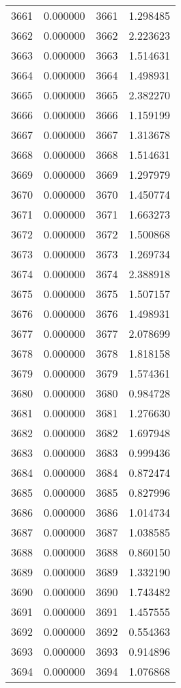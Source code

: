 \documentclass[12pt]{article}
\begin{document}
\begin{longtable}{@{}cccc@{}}
3661 & 0.000000 & 3661 & 1.298485 \\
3662 & 0.000000 & 3662 & 2.223623 \\
3663 & 0.000000 & 3663 & 1.514631 \\
3664 & 0.000000 & 3664 & 1.498931 \\
3665 & 0.000000 & 3665 & 2.382270 \\
3666 & 0.000000 & 3666 & 1.159199 \\
3667 & 0.000000 & 3667 & 1.313678 \\
3668 & 0.000000 & 3668 & 1.514631 \\
3669 & 0.000000 & 3669 & 1.297979 \\
3670 & 0.000000 & 3670 & 1.450774 \\
3671 & 0.000000 & 3671 & 1.663273 \\
3672 & 0.000000 & 3672 & 1.500868 \\
3673 & 0.000000 & 3673 & 1.269734 \\
3674 & 0.000000 & 3674 & 2.388918 \\
3675 & 0.000000 & 3675 & 1.507157 \\
3676 & 0.000000 & 3676 & 1.498931 \\
3677 & 0.000000 & 3677 & 2.078699 \\
3678 & 0.000000 & 3678 & 1.818158 \\
3679 & 0.000000 & 3679 & 1.574361 \\
3680 & 0.000000 & 3680 & 0.984728 \\
3681 & 0.000000 & 3681 & 1.276630 \\
3682 & 0.000000 & 3682 & 1.697948 \\
3683 & 0.000000 & 3683 & 0.999436 \\
3684 & 0.000000 & 3684 & 0.872474 \\
3685 & 0.000000 & 3685 & 0.827996 \\
3686 & 0.000000 & 3686 & 1.014734 \\
3687 & 0.000000 & 3687 & 1.038585 \\
3688 & 0.000000 & 3688 & 0.860150 \\
3689 & 0.000000 & 3689 & 1.332190 \\
3690 & 0.000000 & 3690 & 1.743482 \\
3691 & 0.000000 & 3691 & 1.457555 \\
3692 & 0.000000 & 3692 & 0.554363 \\
3693 & 0.000000 & 3693 & 0.914896 \\
3694 & 0.000000 & 3694 & 1.076868 \\

\end{longtable}
\end{document}
